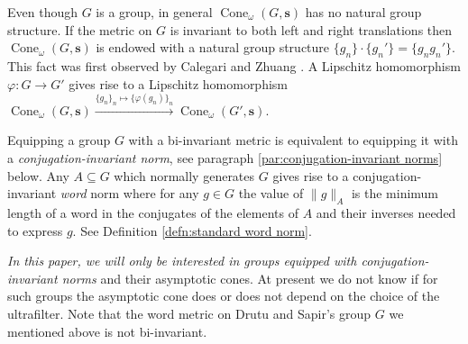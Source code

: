\documentclass[12pt]{amsart}
\theoremstyle{definition}
\newcommand{\B}[1]{\mathbf{#1}}
\newcommand{\xto}[1]{\xrightarrow{#1}}
\newcommand{\OP}[1]{\operatorname{#1}}
\def\Cone{\OP{Cone}}
\begin{document}
Even though $G$ is a group, in general $\Cone_\omega(G,\B s)$ has no natural group structure.
If the metric on $G$ is invariant to both left and right translations then $\Cone_\omega(G,\B s)$ is endowed with a natural group structure $\{g_n\} \cdot \{g_n'\} = \{ g_n g_n'\}$.
This fact was first observed by Calegari and Zhuang \cite{MR2866929}.
A Lipschitz homomorphism $\varphi \colon G \to G'$ gives rise to a Lipschitz homomorphism $\Cone_\omega(G,\B s) \xto{ \{g_n\}_n \mapsto \{ \varphi(g_n)\}_n } \Cone_\omega(G',\B s)$.

Equipping a group $G$ with a bi-invariant metric is equivalent to equipping it with a {\em conjugation-invariant norm}, see paragraph \ref{par:conjugation-invariant norms} below.
Any $A \subseteq G$ which normally generates $G$ gives rise to a conjugation-invariant {\em word} norm where for any $g \in G$ the value of $\| g\|_A$ is the minimum length of a word in the conjugates of the elements of $A$ and their inverses needed to express $g$.
See Definition \ref{defn:standard word norm}.


{\em In this paper, we will only be interested in groups equipped with conjugation-invariant norms} and their asymptotic cones.
At present we do not know if for such groups the asymptotic cone does or does not depend on the choice of the ultrafilter.
Note that the word metric on Drutu and Sapir's group $G$ we mentioned above is not bi-invariant.
\end{document}
